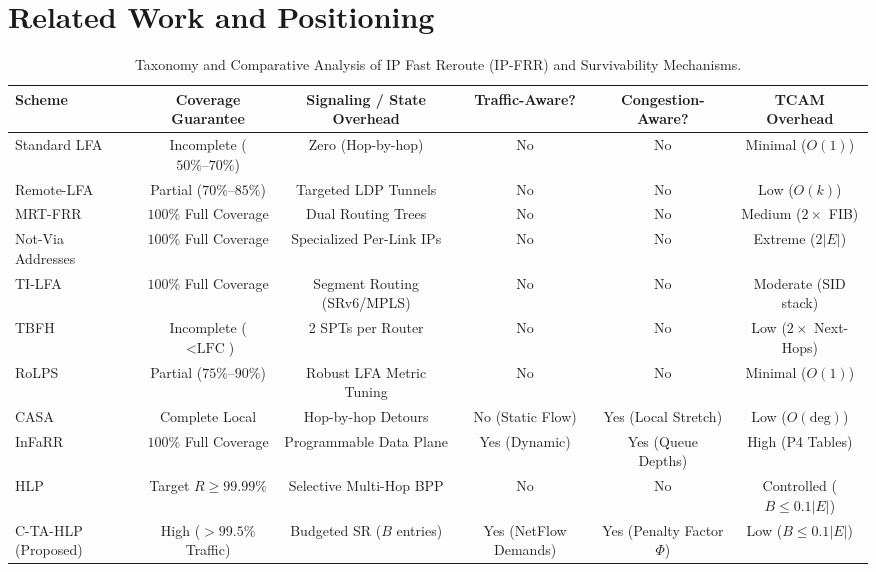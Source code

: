 \documentclass[journal]{IEEEtran}
\begin{document}
\section{Related Work and Positioning}

\begin{table}[t]
\centering
\caption{Taxonomy and Comparative Analysis of IP Fast Reroute (IP-FRR) and Survivability Mechanisms.}
\label{tab:taxonomy}
\begin{tabular}{@{}lccccc@{}}
\toprule
\textbf{Scheme} & \textbf{Coverage Guarantee} & \textbf{Signaling / State Overhead} & \textbf{Traffic-Aware?} & \textbf{Congestion-Aware?} & \textbf{TCAM Overhead} \\ \midrule
Standard LFA~\cite{rfc5286} & Incomplete ($50\%\text{--}70\%$) & Zero (Hop-by-hop) & No & No & Minimal ($O(1)$) \\
Remote-LFA~\cite{rfc7490} & Partial ($70\%\text{--}85\%$) & Targeted LDP Tunnels & No & No & Low ($O(k)$) \\
MRT-FRR~\cite{rfc7812} & $100\%$ Full Coverage & Dual Routing Trees & No & No & Medium ($2\times$ FIB) \\
Not-Via Addresses~\cite{rfc6981} & $100\%$ Full Coverage & Specialized Per-Link IPs & No & No & Extreme ($2|E|$) \\
TI-LFA~\cite{rfc9855} & $100\%$ Full Coverage & Segment Routing (SRv6/MPLS) & No & No & Moderate (SID stack) \\
TBFH~\cite{merindol2011efficient} & Incomplete ($<\text{LFC}$) & 2 SPTs per Router & No & No & Low ($2\times$ Next-Hops) \\
RoLPS~\cite{merling2021rolps} & Partial ($75\%\text{--}90\%$) & Robust LFA Metric Tuning & No & No & Minimal ($O(1)$) \\
CASA~\cite{foerster2019casa} & Complete Local & Hop-by-hop Detours & No (Static Flow) & Yes (Local Stretch) & Low ($O(\text{deg})$) \\
InFaRR~\cite{verdi2023infarr} & $100\%$ Full Coverage & Programmable Data Plane & Yes (Dynamic) & Yes (Queue Depths) & High (P4 Tables) \\
HLP~\cite{geng2020hybrid} & Target $R \ge 99.99\%$ & Selective Multi-Hop BPP & No & No & Controlled ($B \le 0.1|E|$) \\
C-TA-HLP (Proposed) & High ($>99.5\%$ Traffic) & Budgeted SR ($B$ entries) & Yes (NetFlow Demands) & Yes (Penalty Factor $\Phi$) & Low ($B \le 0.1|E|$) \\ \bottomrule
\end{tabular}
\end{table}
\end{document}
